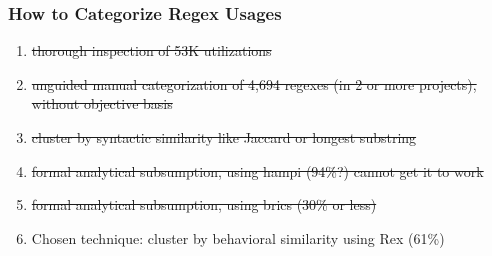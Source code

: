 


\begin{frame}
\frametitle{How to Categorize Regex Usages}
\begin{enumerate}
\item \sout{thorough inspection of 53K utilizations}
\item \sout{unguided manual categorization of 4,694 regexes (in 2 or more projects), without objective basis}
\item \sout{cluster by syntactic similarity like Jaccard or longest substring}
\item \sout{formal analytical subsumption, using hampi (94\%?) cannot get it to work}
\item \sout{formal analytical subsumption, using brics (30\% or less)}
\item \begin{Large}Chosen technique: cluster by behavioral similarity using Rex (61\%)\end{Large}
\end{enumerate}
\end{frame}



